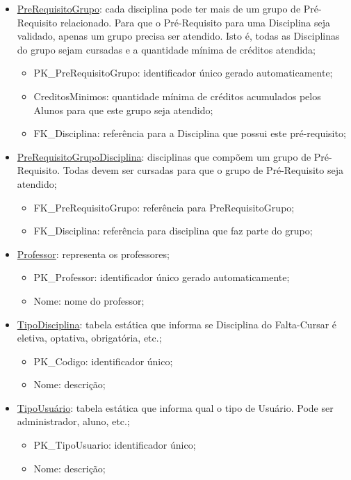 \documentclass[graduacao,brazil]{ThesisPUC}
\begin{document}
\begin{itemize}
	\item \underline{PreRequisitoGrupo}: cada disciplina pode ter mais de um grupo de Pré-Requisito relacionado. Para que o Pré-Requisito para uma Disciplina seja validado, apenas um grupo precisa ser atendido. Isto é, todas as Disciplinas do grupo sejam cursadas e a quantidade mínima de créditos atendida;
	\begin{itemize}
		\item PK\_PreRequisitoGrupo: identificador único gerado automaticamente;
		\item CreditosMinimos: quantidade mínima de créditos acumulados pelos Alunos para que este grupo seja atendido;
		\item FK\_Disciplina: referência para a Disciplina que possui este pré-requisito;
	\end{itemize}

	\item \underline{PreRequisitoGrupoDisciplina}: disciplinas que compõem um grupo de Pré-Requisito. Todas devem ser cursadas para que o grupo de Pré-Requisito seja atendido;
	\begin{itemize}
		\item FK\_PreRequisitoGrupo: referência para PreRequisitoGrupo;
		\item FK\_Disciplina: referência para disciplina que faz parte do grupo;
	\end{itemize}

	\item \underline{Professor}: representa os professores;
	\begin{itemize}
		\item PK\_Professor: identificador único gerado automaticamente;
		\item Nome: nome do professor;
	\end{itemize}

	\item \underline{TipoDisciplina}: tabela estática que informa se Disciplina do Falta-Cursar é eletiva, optativa, obrigatória, etc.;
	\begin{itemize}
		\item PK\_Codigo: identificador único;
		\item Nome: descrição;
	\end{itemize}

	\item \underline{TipoUsuário}: tabela estática que informa qual o tipo de Usuário. Pode ser administrador, aluno, etc.;
	\begin{itemize}
		\item PK\_TipoUsuario: identificador único;
		\item Nome: descrição;
	\end{itemize}


\end{itemize}
\end{document}
